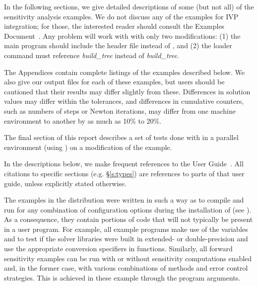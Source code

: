 In the following sections, we give detailed descriptions of some (but
not all) of the sensitivity analysis examples. We do not discuss any of the 
examples for IVP integration; for those, the interested reader should consult
the {\cvode} Examples Document~\cite{cvode2.4.0_ex}. Any {\cvode} problem
will work with {\cvodes} with only two modifications: (1) the main program
should include the header file  instead of , and
(2) the loader command must reference
{\em build\_tree} instead of
{\em build\_tree}.

The Appendices contain complete listings
of the examples described below.  We also give our output files for
each of these examples, but users should be cautioned that their
results may differ slightly from these.  Differences in solution
values may differ within the tolerances, and differences in cumulative
counters, such as numbers of steps or Newton iterations, may differ
from one machine environment to another by as much as 10\% to 20\%.

The final section of this report describes a set of tests done with
{\cvodes} in a parallel environment (using {\nvecp}) on a modification of
the  example.

In the descriptions below, we make frequent references to the {\cvodes}
User Guide~\cite{cvodes2.3.0_ug}.  All citations to specific sections
(e.g. \S\ref{s:types}) are references to parts of that user guide, unless
explicitly stated otherwise.

\vspace{0.2in}
The examples in the {\cvodes} distribution were written in such a way as
to compile and run for any combination of configuration options during
the installation of {\sundials} (see ). As a consequence,
they contain portions of code that will not typically be present in a
user program. For example, all example programs make use of the
variables  and 
to test if the solver libraries
were built in extended- or double-precision and use the appropriate conversion 
specifiers in  functions. Similarly, all forward sensitivity
examples can be run with or without sensitivity computations enabled and,
in the former case, with various combinations of methods and error control 
strategies. This is achieved in these example through the program arguments.

